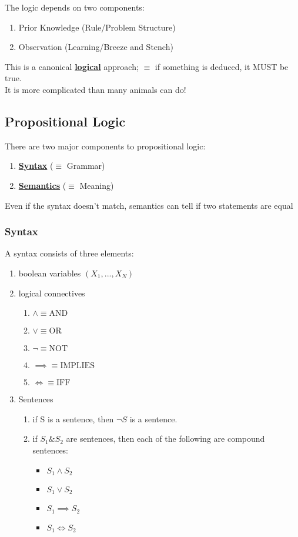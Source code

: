 \documentclass[../../lecture_notes.tex]{subfiles}
\begin{document}
\noindent The logic depends on two components:
\begin{enumerate} [itemsep=0mm]
	\item Prior Knowledge (Rule/Problem Structure)
	\item Observation (Learning/Breeze and Stench)
\end{enumerate}
This is a canonical \textbf{\underline{logical}} approach; 
	$\equiv$ if something is deduced, it MUST be true.\\
It is more complicated than many animals can do!
    
\subsection*{Propositional Logic}
\noindent There are two major components to propositional logic:
\begin{enumerate} [itemsep=0mm]
	\item \textbf{\underline{Syntax}} ($\equiv$ Grammar)
	\item \textbf{\underline{Semantics}} ($\equiv$ Meaning)
\end{enumerate}
\noindent Even if the syntax doesn’t match, semantics can tell if two statements are equal

\subsubsection*{Syntax}
\noindent A syntax consists of three elements:
\begin{enumerate} [itemsep=0mm]
	\item boolean variables $(X_1, ..., X_N)$
	\item logical connectives
		\begin{enumerate} [itemsep=0mm]
			\item $\land \equiv \text{AND}$
			\item $\lor \equiv \text{OR}$
			\item $\neg \equiv \text{NOT}$
			\item $\implies \equiv \text{IMPLIES}$
			\item $\iff \equiv \text{IFF}$
		\end{enumerate}
	\item Sentences
		\begin{enumerate} [itemsep=0mm]
			\item if S is a sentence, then $\neg S$ is a sentence.
			\item if $S_1 \& S_2$ are sentences, then each of the following are compound sentences:
				\begin{itemize} [itemsep=0mm]
					\item $S_1 \land S_2$
					\item $S_1 \lor S_2$
					\item $S_1 \implies S_2$
					\item $S_1 \iff S_2$
				\end{itemize}
		\end{enumerate}
\end{enumerate}
\end{document}
